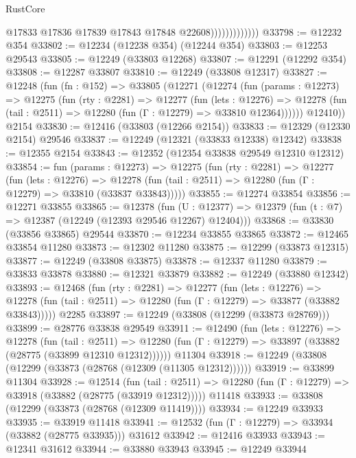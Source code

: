 \begin{lexlean}{RustCore}
\begin{coremodule}
                              @17833
                              @17836
                              @17839
                              @17843
                              @17848
                              @22608)))))))))))))
@33798 := @12232 @354
@33802 := @12234 (@12238 @354) (@12244 @354)
@33803 := @12253 @29543
@33805 := @12249 (@33803 @12268)
@33807 := @12291 (@12292 @354)
@33808 := @12287 @33807
@33810 := @12249 (@33808 @12317)
@33827 := @12248
    (fun (fn : @152) =>
    @33805
      (@12271
        (@12274
          (fun (params : @12273) =>
          @12275
            (fun (rty : @2281) =>
            @12277
              (fun (lets : @12276) =>
              @12278 (fun (tail : @2511) => @12280 (fun (Γ : @12279) => @33810 @12364))))))
        @12410))
    @2154
@33830 := @12416 (@33803 (@12266 @2154))
@33833 := @12329 (@12330 @2154) @29546
@33837 := @12249 (@12321 (@33833 @12338) @12342)
@33838 := @12355 @2154
@33843 := @12352 (@12354 @33838 @29549 @12310 @12312)
@33854 := fun (params : @12273) =>
  @12275
    (fun (rty : @2281) =>
    @12277
      (fun (lets : @12276) =>
      @12278 (fun (tail : @2511) => @12280 (fun (Γ : @12279) => @33810 (@33837 @33843)))))
@33855 := @12274 @33854
@33856 := @12271 @33855
@33865 := @12378
    (fun (U : @12377) => @12379 (fun (t : @7) => @12387 (@12249 (@12393 @29546 @12267) @12404)))
@33868 := @33830 (@33856 @33865) @29544
@33870 := @12234 @33855 @33865
@33872 := @12465 @33854 @11280
@33873 := @12302 @11280
@33875 := @12299 (@33873 @12315)
@33877 := @12249 (@33808 @33875)
@33878 := @12337 @11280
@33879 := @33833 @33878
@33880 := @12321 @33879
@33882 := @12249 (@33880 @12342)
@33893 := @12468
    (fun (rty : @2281) =>
    @12277
      (fun (lets : @12276) =>
      @12278 (fun (tail : @2511) => @12280 (fun (Γ : @12279) => @33877 (@33882 @33843)))))
    @2285
@33897 := @12249 (@33808 (@12299 (@33873 @28769)))
@33899 := @28776 @33838 @29549
@33911 := @12490
    (fun (lets : @12276) =>
    @12278
      (fun (tail : @2511) =>
      @12280 (fun (Γ : @12279) => @33897 (@33882 (@28775 (@33899 @12310 @12312))))))
    @11304
@33918 := @12249 (@33808 (@12299 (@33873 (@28768 (@12309 (@11305 @12312))))))
@33919 := @33899 @11304
@33928 := @12514
    (fun (tail : @2511) => @12280 (fun (Γ : @12279) => @33918 (@33882 (@28775 (@33919 @12312)))))
    @11418
@33933 := @33808 (@12299 (@33873 (@28768 (@12309 @11419))))
@33934 := @12249 @33933
@33935 := @33919 @11418
@33941 := @12532 (fun (Γ : @12279) => @33934 (@33882 (@28775 @33935))) @31612
@33942 := @12416 @33933
@33943 := @12341 @31612
@33944 := @33880 @33943
@33945 := @12249 @33944

\end{coremodule}
\end{lexlean}
